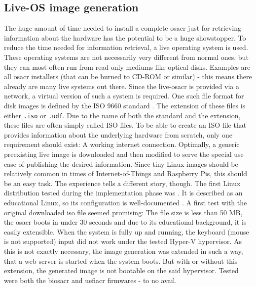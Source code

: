 \subsection{Live-OS image generation}
The huge amount of time needed to install a complete \gls{osacr} just for retrieving information about the hardware has the potential to be a huge showstopper. To reduce the time needed for information retrieval, a live operating system is used. These operating systems are not necessarily very different from normal ones, but they can most often run from read-only mediums like optical disks. Examples are all \gls{osacr} installers (that can be burned to CD-ROM or similar) - this means there already are many live systems out there.
\newline
Since the live-\gls{osacr} is provided via a network, a virtual version of such a system is required. One such file format for disk images is defined by the ISO 9660 standard \cite{iso9660_spec}. The extension of these files is either \texttt{.iso} or \texttt{.udf}. Due to the name of both the standard and the extension, these files are often simply called ISO files.
\newline
To be able to create an ISO file that provides information about the underlying hardware from scratch, only one requirement should exist: A working internet connection. Optimally, a generic preexisting live image is downloaded and then modified to serve the special use case of publishing the desired information. Since tiny Linux images should be relatively common in times of Internet-of-Things and Raspberry Pis, this should be an easy task. The experience tells a different story, though.
\newline
The first Linux distribution tested during the implementation phase was . It is described as an educational Linux, so its configuration is well-documented \cite{mll}. A first test with the original downloaded iso file seemed promising: The file size is less than 50 MB, the \gls{osacr} boots in under 30 seconds and due to its educational background, it is easily extensible. When the system is fully up and running, the keyboard (mouse is not supported) input did not work under the tested Hyper-V hypervisor. As this is not exactly necessary, the image generation was extended in such a way, that a web server is started when the system boots. But with or without this extension, the generated image is not bootable on the said hypervisor. Tested were both the \gls{biosacr} and \gls{uefiacr} firmwares - to no avail.
